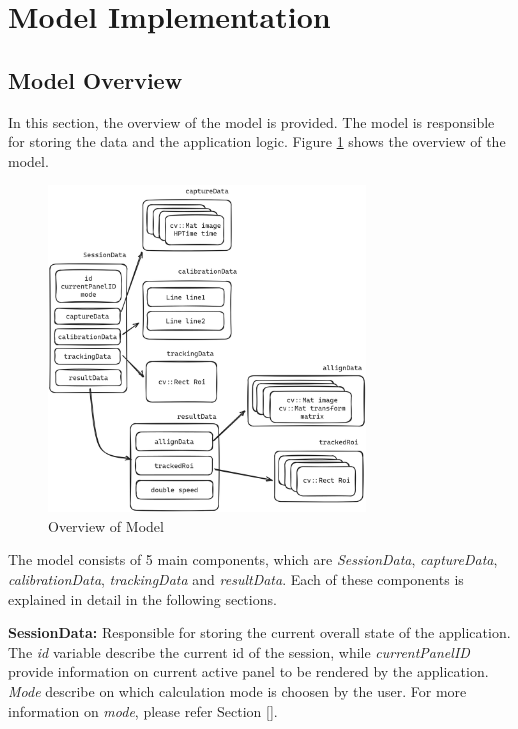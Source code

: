 \section{Model Implementation}
\label{sec:model_implementation}

\subsection{Model Overview}
\label{subsec:model_overview}
In this section, the overview of the model is provided. The model is responsible for storing the data and the application logic. Figure \ref{fig:model_overview} shows the overview of the model.

\begin{figure}[!ht]
    \centering
    \includegraphics[width=0.75\textwidth]{texs/Part2/chapter4/image/sessiondata.png}
    \caption{Overview of Model}
    \label{fig:model_overview}
\end{figure}

The model consists of 5 main components, which are \textit{SessionData}, \textit{captureData}, \textit{calibrationData}, \textit{trackingData} and \textit{resultData}. Each of these components is explained in detail in the following sections.

\textbf{SessionData:} Responsible for storing the current overall state of the application. The \textit{id} variable describe the current id of the session, while \textit{currentPanelID} provide information on current active panel to be rendered by the application. \textit{Mode} describe on which calculation mode is choosen by the user. For more information on \textit{mode}, please refer Section \ref{}.

